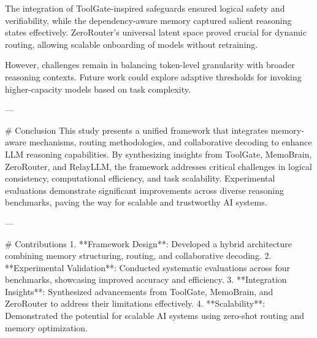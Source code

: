 The integration of ToolGate-inspired safeguards ensured logical safety and verifiability, while the dependency-aware memory captured salient reasoning states effectively. ZeroRouter's universal latent space proved crucial for dynamic routing, allowing scalable onboarding of models without retraining.

However, challenges remain in balancing token-level granularity with broader reasoning contexts. Future work could explore adaptive thresholds for invoking higher-capacity models based on task complexity.

---

# Conclusion  
This study presents a unified framework that integrates memory-aware mechanisms, routing methodologies, and collaborative decoding to enhance LLM reasoning capabilities. By synthesizing insights from ToolGate, MemoBrain, ZeroRouter, and RelayLLM, the framework addresses critical challenges in logical consistency, computational efficiency, and task scalability. Experimental evaluations demonstrate significant improvements across diverse reasoning benchmarks, paving the way for scalable and trustworthy AI systems.

---

# Contributions  
1. **Framework Design**: Developed a hybrid architecture combining memory structuring, routing, and collaborative decoding.  
2. **Experimental Validation**: Conducted systematic evaluations across four benchmarks, showcasing improved accuracy and efficiency.  
3. **Integration Insights**: Synthesized advancements from ToolGate, MemoBrain, and ZeroRouter to address their limitations effectively.  
4. **Scalability**: Demonstrated the potential for scalable AI systems using zero-shot routing and memory optimization.